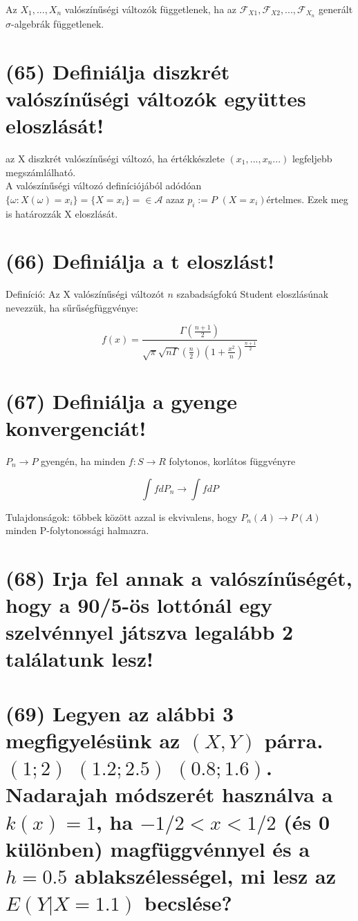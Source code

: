 \documentclass[12p]{article}
\begin{document}
 Az $X_1,...,X_n$ valószínűségi változók függetlenek, ha az $\mathscr{F}_{X1}, \mathscr{F}_{X2} ,...,\mathscr{F}_{X_n}$ generált $\sigma$-algebrák függetlenek.

\section{(65) Definiálja diszkrét valószínűségi változók együttes eloszlását!}

az X diszkrét valószínűségi változó, ha értékkészlete $(x_1 ,..., x_n...)$ legfeljebb megszámlálható.\\
A valószínűségi változó definíciójából adódóan $\{\omega:X(\omega)= x_i\}=\{X=x_i\}= \in \mathscr{A}$ azaz $p_i:=P$ $(X=x_i)$értelmes. Ezek meg is határozzák X eloszlását.

\section{(66) Definiálja a t eloszlást!}

Definíció:  Az X  valószínűségi változót $n$ szabadságfokú Student eloszlásúnak nevezzük, ha sűrűségfüggvénye:

$$f(x) = \frac{\Gamma \left(\frac{n+1}{2}\right)}{\sqrt{\pi} \sqrt{n \Gamma} \left(\frac{n}{2}\right) \left(1 + \frac{x^2}{n}\right)^{\frac{n+1}{2}}}$$

\section{(67) Definiálja a gyenge konvergenciát!}

$P_n \rightarrow P$ gyengén, ha minden $f: S \rightarrow R$ folytonos, korlátos függvényre

$$\int fdP_n \rightarrow \int fdP$$

Tulajdonságok: többek között azzal is
ekvivalens, hogy $P_n(A) \rightarrow P(A)$ minden P-folytonossági halmazra.

\section{(68) Irja fel annak a valószínűségét, hogy a 90/5-ös lottónál egy szelvénnyel játszva legalább 2 találatunk lesz!}

\section{(69) Legyen az alábbi 3 megfigyelésünk az $(X, Y)$ párra. $(1;2)$ $(1.2;2.5)$ $(0.8;1.6)$. Nadarajah
módszerét használva a $k(x) = 1$, ha $-1/2 < x < 1/2$ (és 0 különben) magfüggvénnyel és a $h = 0.5$ ablakszélességel, mi lesz az $E(Y|X = 1.1)$ becslése?}
\end{document}
